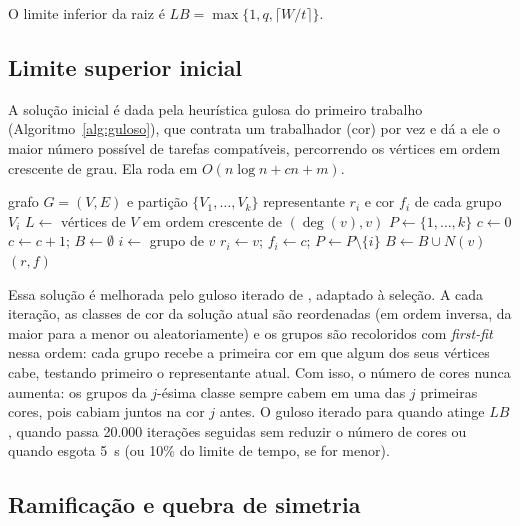 \documentclass[12pt]{article}
\newcommand{\LB}{\mathit{LB}}
\begin{document}
O limite inferior da raiz é $\LB=\max\{1,q,\lceil W/t\rceil\}$.

\subsection{Limite superior inicial}

A solução inicial é dada pela heurística gulosa do primeiro trabalho
(Algoritmo~\ref{alg:guloso}), que contrata um trabalhador (cor) por vez e dá a
ele o maior número possível de tarefas compatíveis, percorrendo os vértices em
ordem crescente de grau. Ela roda em $O(n\log n+cn+m)$.

\begin{algorithm}[ht]
  \caption{Guloso por classes de cor (Trabalho 1)}\label{alg:guloso}
  \begin{algorithmic}[1]
    \Require grafo $G=(V,E)$ e partição $\{V_1,\dots,V_k\}$
    \Ensure representante $r_i$ e cor $f_i$ de cada grupo $V_i$
    \State $L \gets$ vértices de $V$ em ordem crescente de $(\deg(v), v)$
    \State $P \gets \{1,\dots,k\}$ 
    \State $c \gets 0$
      \State $c \gets c+1$; \quad $B \gets \emptyset$ 
        \State $i \gets$ grupo de $v$
          \State $r_i \gets v$; \quad $f_i \gets c$; \quad $P \gets P\setminus\{i\}$
          \State $B \gets B \cup N(v)$
        \EndIf
      \EndFor
    \EndWhile
    \State \Return $(r, f)$
  \end{algorithmic}
\end{algorithm}

Essa solução é melhorada pelo guloso iterado de \cite{culberson1996}, adaptado
à seleção. A cada iteração, as classes de cor da solução atual são
reordenadas (em ordem inversa, da maior para a menor ou aleatoriamente) e os
grupos são recoloridos com \emph{first-fit} nessa ordem: cada grupo recebe a
primeira cor em que algum dos seus vértices cabe, testando primeiro o
representante atual. Com isso, o número de cores nunca aumenta: os grupos da
$j$-ésima classe sempre cabem em uma das $j$ primeiras cores, pois cabiam
juntos na cor $j$ antes. O guloso iterado para quando atinge $\LB$, quando
passa 20.000 iterações seguidas sem reduzir o número de cores ou quando esgota
5~s (ou 10\% do limite de tempo, se for menor).

\subsection{Ramificação e quebra de simetria}\label{sec:ramificacao}
\end{document}
